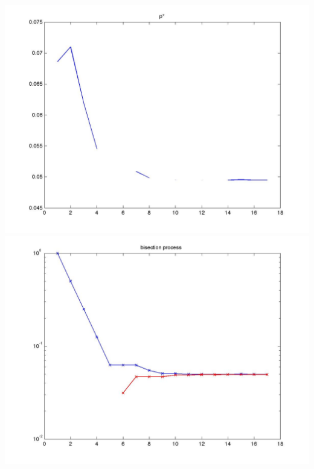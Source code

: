 \documentclass[12pt,a4paper]{article}
\begin{document}
\begin{center}
\includegraphics[scale = 0.18]{hw4A79_pstar.jpg}
\includegraphics[scale = 0.18]{hw4A79_bisection.jpg}
\end{center}
\end{document}
